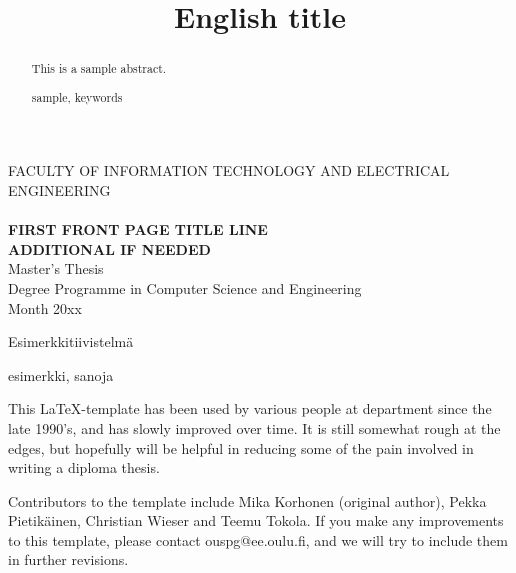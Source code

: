 \documentclass[a4paper, 12pt,titlepage]{dithesis}
\title{English title}
\begin{document}
\begin{titlepage}
	{\sffamily\fontsize{9}{1pt}\selectfont FACULTY OF INFORMATION TECHNOLOGY AND ELECTRICAL ENGINEERING\\}
	\vspace{65 mm}
	{\textbf{\fontsize{16}{19pt}\selectfont \getfirstname\ \getlastname }\\}
	\vspace{15 mm}
	{\textbf{\fontsize{18}{22pt}\selectfont FIRST FRONT PAGE TITLE LINE\\ADDITIONAL IF NEEDED\\}}
	\vspace{60 mm}
	{\fontsize{14}{17}\selectfont Master's Thesis \\Degree Programme in Computer Science and Engineering \\ Month 20xx\\}
\end{titlepage}


\begin{abstract}
This is a sample abstract.

\keywords sample, keywords

\end{abstract}

\begin{tiivistelma}
Esimerkkitiivistelmä

\avainsanat esimerkki, sanoja
\end{tiivistelma}


\sisluettelo

This \LaTeX -template has been used by various people at department
since the late 1990's, and has slowly improved over time.  It is still
somewhat rough at the edges, but hopefully will be helpful in reducing
some of the pain involved in writing a diploma thesis.

Contributors to the template include Mika Korhonen (original author),
Pekka Pietikäinen, Christian Wieser and Teemu Tokola.  If you make any
improvements to this template, please contact ouspg@ee.oulu.fi, and we
will try to include them in further revisions.
\end{document}
